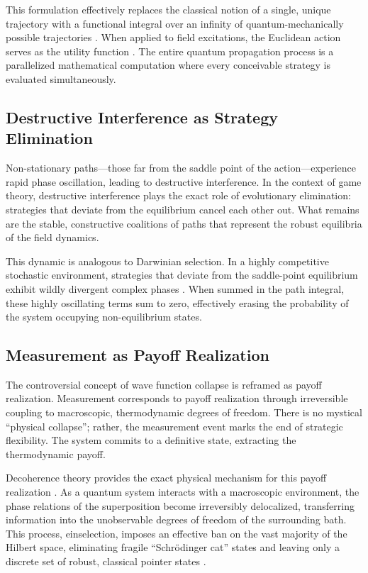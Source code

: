 \documentclass[12pt,a4paper]{article}
\theoremstyle{remark}
\begin{document}
This formulation effectively replaces the classical notion of a single, unique trajectory with a functional integral over an infinity of quantum-mechanically possible trajectories \citep{PathIntegral}. When applied to field excitations, the Euclidean action serves as the utility function \citep{PathIntegralOptimization}. The entire quantum propagation process is a parallelized mathematical computation where every conceivable strategy is evaluated simultaneously.

\subsection{Destructive Interference as Strategy Elimination}

Non-stationary paths---those far from the saddle point of the action---experience rapid phase oscillation, leading to destructive interference. In the context of game theory, destructive interference plays the exact role of evolutionary elimination: strategies that deviate from the equilibrium cancel each other out. What remains are the stable, constructive coalitions of paths that represent the robust equilibria of the field dynamics.

This dynamic is analogous to Darwinian selection. In a highly competitive stochastic environment, strategies that deviate from the saddle-point equilibrium exhibit wildly divergent complex phases \citep{QuantumStrategies2024}. When summed in the path integral, these highly oscillating terms sum to zero, effectively erasing the probability of the system occupying non-equilibrium states.

\subsection{Measurement as Payoff Realization}

The controversial concept of wave function collapse is reframed as payoff realization. Measurement corresponds to payoff realization through irreversible coupling to macroscopic, thermodynamic degrees of freedom. There is no mystical ``physical collapse''; rather, the measurement event marks the end of strategic flexibility. The system commits to a definitive state, extracting the thermodynamic payoff.

Decoherence theory provides the exact physical mechanism for this payoff realization \citep{MeasurementClassical}. As a quantum system interacts with a macroscopic environment, the phase relations of the superposition become irreversibly delocalized, transferring information into the unobservable degrees of freedom of the surrounding bath. This process, einselection, imposes an effective ban on the vast majority of the Hilbert space, eliminating fragile ``Schr\"odinger cat'' states and leaving only a discrete set of robust, classical pointer states \citep{Zurek2003}.
\end{document}
